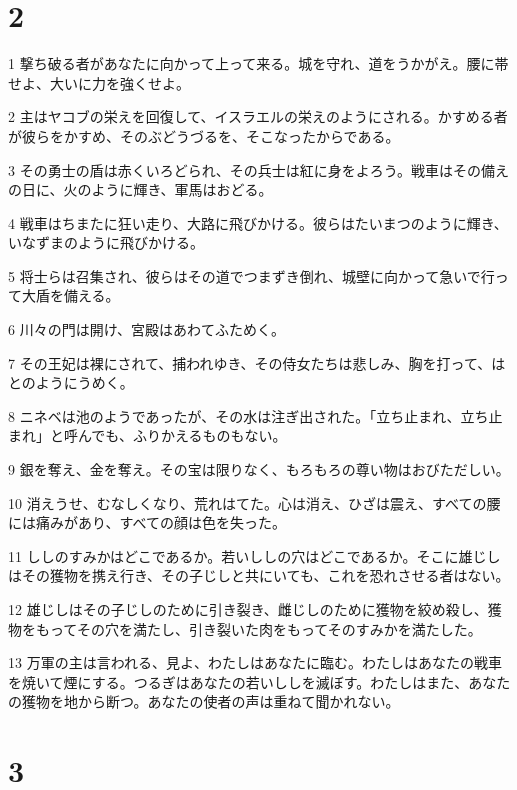 \chapter{2}

\par 1 撃ち破る者があなたに向かって上って来る。城を守れ、道をうかがえ。腰に帯せよ、大いに力を強くせよ。
\par 2 主はヤコブの栄えを回復して、イスラエルの栄えのようにされる。かすめる者が彼らをかすめ、そのぶどうづるを、そこなったからである。
\par 3 その勇士の盾は赤くいろどられ、その兵士は紅に身をよろう。戦車はその備えの日に、火のように輝き、軍馬はおどる。
\par 4 戦車はちまたに狂い走り、大路に飛びかける。彼らはたいまつのように輝き、いなずまのように飛びかける。
\par 5 将士らは召集され、彼らはその道でつまずき倒れ、城壁に向かって急いで行って大盾を備える。
\par 6 川々の門は開け、宮殿はあわてふためく。
\par 7 その王妃は裸にされて、捕われゆき、その侍女たちは悲しみ、胸を打って、はとのようにうめく。
\par 8 ニネベは池のようであったが、その水は注ぎ出された。「立ち止まれ、立ち止まれ」と呼んでも、ふりかえるものもない。
\par 9 銀を奪え、金を奪え。その宝は限りなく、もろもろの尊い物はおびただしい。
\par 10 消えうせ、むなしくなり、荒れはてた。心は消え、ひざは震え、すべての腰には痛みがあり、すべての顔は色を失った。
\par 11 ししのすみかはどこであるか。若いししの穴はどこであるか。そこに雄じしはその獲物を携え行き、その子じしと共にいても、これを恐れさせる者はない。
\par 12 雄じしはその子じしのために引き裂き、雌じしのために獲物を絞め殺し、獲物をもってその穴を満たし、引き裂いた肉をもってそのすみかを満たした。
\par 13 万軍の主は言われる、見よ、わたしはあなたに臨む。わたしはあなたの戦車を焼いて煙にする。つるぎはあなたの若いししを滅ぼす。わたしはまた、あなたの獲物を地から断つ。あなたの使者の声は重ねて聞かれない。

\chapter{3}

